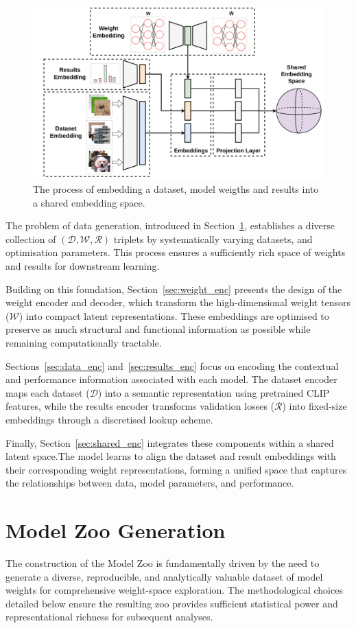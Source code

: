 \begin{figure}[!t]
    \centering
    \includegraphics[width=0.75\linewidth]{pipeline.png}
    \caption[The process of embedding a dataset, model weigths and results into a shared embedding space ]{The process of embedding a dataset, model weigths and results into a shared embedding space. }
    \label{fig:pipeline_2}
\end{figure}

The problem of data generation, introduced in Section~\ref{sec:data_gen}, establishes a diverse collection of $(\mathcal{D}, \mathcal{W}, \mathcal{R})$ triplets by systematically varying datasets, and optimisation parameters. This process ensures a sufficiently rich space of weights and results for downstream learning.  

Building on this foundation, Section~\ref{sec:weight_enc} presents the design of the weight encoder and decoder, which transform the high-dimensional weight tensors ($\mathcal{W}$) into compact latent representations. These embeddings are optimised to preserve as much structural and functional information as possible while remaining computationally tractable.  

Sections~\ref{sec:data_enc} and~\ref{sec:results_enc} focus on encoding the contextual and performance information associated with each model. The dataset encoder maps each dataset ($\mathcal{D}$) into a semantic representation using pretrained CLIP features, while the results encoder transforms validation losses ($\mathcal{R}$) into fixed-size embeddings through a discretised lookup scheme. 

Finally, Section~\ref{sec:shared_enc} integrates these components within a shared latent space.The model learns to align the dataset and result embeddings with their corresponding weight representations, forming a unified space that captures the relationships between data, model parameters, and performance.

\section{Model Zoo Generation}
\label{sec:data_gen}
The construction of the Model Zoo is fundamentally driven by the need to generate a diverse, reproducible, and analytically valuable dataset of model weights for comprehensive weight-space exploration. The methodological choices detailed below ensure the resulting zoo provides sufficient statistical power and representational richness for subsequent analyses.


